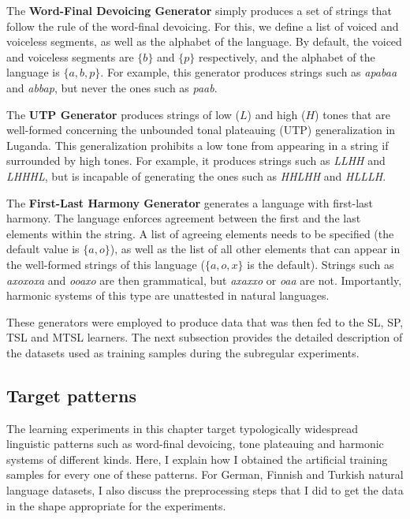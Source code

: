 The \textbf{Word-Final Devoicing Generator} simply produces a set of strings that follow the rule of the word-final devoicing.
For this, we define a list of voiced and voiceless segments, as well as the alphabet of the language.
By default, the voiced and voiceless segments are $\{b\}$ and $\{p\}$ respectively, and the alphabet of the language is $\{a, b, p\}$.
For example, this generator produces strings such as \emph{apabaa} and \emph{abbap}, but never the ones such as \emph{paab}.


The \textbf{UTP Generator} produces strings of low ($L$) and high ($H$) tones that are well-formed concerning the unbounded tonal plateauing (UTP) generalization in Luganda.
This generalization prohibits a low tone from appearing in a string if surrounded by high tones.
For example, it produces strings such as \emph{LLHH} and \emph{LHHHL}, but is incapable of generating the ones such as \emph{HHLHH} and \emph{HLLLH}.


The \textbf{First-Last Harmony Generator} generates a language with first-last harmony.
The language enforces agreement between the first and the last elements within the string.
A list of agreeing elements needs to be specified (the default value is $\{a, o\}$), as well as the list of all other elements that can appear in the well-formed strings of this language ($\{a, o, x\}$ is the default).
Strings such as \emph{axoxoxa} and \emph{ooaxo} are then grammatical, but \emph{axaxxo} or \emph{oaa} are not.
Importantly, harmonic systems of this type are unattested in natural languages.

These generators were employed to produce data that was then fed to the SL, SP, TSL and MTSL learners.
The next subsection provides the detailed description of the datasets used as training samples during the subregular experiments.


\subsection{Target patterns}

The learning experiments in this chapter target typologically widespread linguistic patterns such as word-final devoicing, tone plateauing and harmonic systems of different kinds.
Here, I explain how I obtained the artificial training samples for every one of these patterns.
For German, Finnish and Turkish natural language datasets, I also discuss the preprocessing steps that I did to get the data in the shape appropriate for the experiments.


